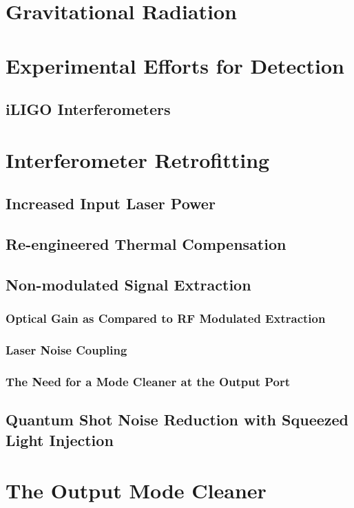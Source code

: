 \documentclass[12pt,vi,twoside]{mitthesis}
\begin{document}

\pagestyle{plain}

%


\chapter{Gravitational Radiation}

\chapter{Experimental Efforts for Detection}
\section{iLIGO Interferometers}

\chapter{Interferometer Retrofitting}
\section{Increased Input Laser Power}
\section{Re-engineered Thermal Compensation}
\section{Non-modulated Signal Extraction}
\subsection{Optical Gain as Compared to RF Modulated Extraction}
\subsection{Laser Noise Coupling}
\subsection{The Need for a Mode Cleaner at the Output Port}
\section{Quantum Shot Noise Reduction with Squeezed Light Injection}

\chapter{The Output Mode Cleaner}
\end{document}
